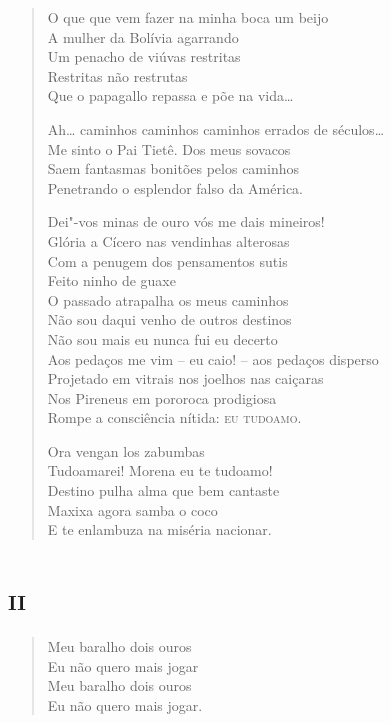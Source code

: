 {\begin{verse}
O que que vem fazer na minha boca um beijo\\
A mulher da Bolívia agarrando\\
Um penacho de viúvas restritas\\
Restritas não restrutas\\
Que o papagallo repassa e põe na vida\ldots{}

Ah\ldots{} caminhos caminhos caminhos errados de séculos\ldots{}\\
Me sinto o Pai Tietê. Dos meus sovacos\\
Saem fantasmas bonitões pelos caminhos\\
Penetrando o esplendor falso da América.

Dei"-vos minas de ouro vós me dais mineiros!\\
Glória a Cícero nas vendinhas alterosas\\
Com a penugem dos pensamentos sutis\\
Feito ninho de guaxe\\
O passado atrapalha os meus caminhos\\
Não sou daqui venho de outros destinos\\
Não sou mais eu nunca fui eu decerto\\
Aos pedaços me vim -- eu caio! -- aos pedaços disperso\\
Projetado em vitrais nos joelhos nas caiçaras\\
Nos Pireneus em pororoca prodigiosa\\
Rompe a consciência nítida: \textsc{eu tudoamo.}

Ora vengan los zabumbas\\
Tudoamarei! Morena eu te tudoamo!\\
Destino pulha alma que bem cantaste\\
Maxixa agora samba o coco\\
E te enlambuza na miséria nacionar.
\end{verse}

\chapter[«Meu baralho dois ouros»]{\textsc{ii}}

\begin{verse}
\qquad\qquad\quad Meu baralho dois ouros\\
\qquad\qquad\quad Eu não quero mais jogar\\
\qquad\qquad\quad Meu baralho dois ouros\\
\qquad\qquad\quad Eu não quero mais jogar.


\end{verse}}
